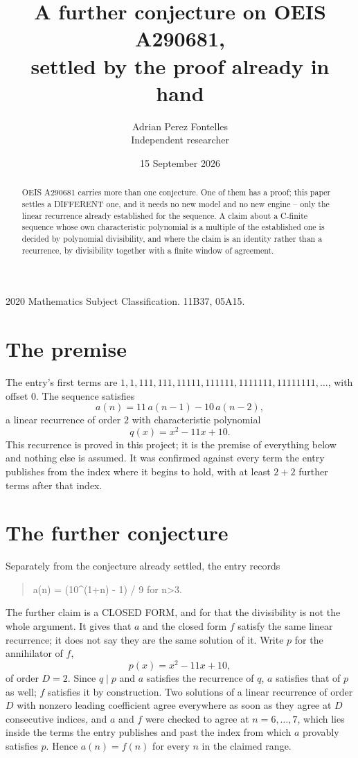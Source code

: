 \documentclass[11pt,a4paper]{article}
\title{A further conjecture on OEIS A290681,\\ \large settled by the proof already in hand}
\author{Adrian Perez Fontelles\\ \small Independent researcher}
\date{15 September 2026}
\theoremstyle{plain}
\theoremstyle{definition}
\begin{document}
\maketitle

\begin{abstract}
OEIS A290681 carries more than one conjecture. One of them has a proof; this paper settles a
DIFFERENT one, and it needs no new model and no new engine -- only the linear recurrence already
established for the sequence. A claim about a C-finite sequence whose own characteristic
polynomial is a multiple of the established one is decided by polynomial divisibility, and where
the claim is an identity rather than a recurrence, by divisibility together with a finite window
of agreement.
\end{abstract}

\noindent\small 2020 Mathematics Subject Classification. 11B37, 05A15.\normalsize

\section{The premise}

The entry's first terms are $1, 1, 111, 111, 11111, 111111, 1111111, 11111111,\dots$, with offset $0$. The sequence satisfies
\[
  a(n)=11\,a(n-1) - 10\,a(n-2) ,
\]
a linear recurrence of order $2$ with characteristic polynomial
\[
  q(x)=x^{2} - 11 x + 10 .
\]
This recurrence is proved in this project; it is the premise of everything below and nothing else is assumed.
It was confirmed against every term the entry publishes from the index where it begins to hold,
with at least $2+2$ further terms after that index.

\section{The further conjecture}

Separately from the conjecture already settled, the entry records

\begin{quote}\raggedright a(n) = (10\^{}(1+n) - 1) / 9 for n>3.\end{quote}

The further claim is a CLOSED FORM, and for that the divisibility is not the whole argument. It
gives that $a$ and the closed form $f$ satisfy the same linear recurrence; it does not say they
are the same solution of it. Write $p$ for the annihilator of $f$,
\[
  p(x)=x^{2} - 11 x + 10 ,
\]
of order $D=2$. Since $q\mid p$ and $a$ satisfies the recurrence of $q$, $a$ satisfies that of
$p$ as well; $f$ satisfies it by construction. Two solutions of a linear recurrence of order $D$
with nonzero leading coefficient agree everywhere as soon as they agree at $D$ consecutive
indices, and $a$ and $f$ were checked to agree at $n=6,\dots,7$,
which lies inside the terms the entry publishes and past the index from which $a$ provably
satisfies $p$. Hence $a(n)=f(n)$ for every $n$ in the claimed range.
\end{document}
